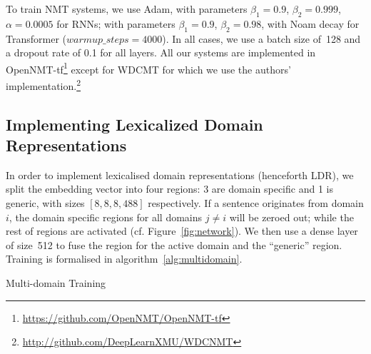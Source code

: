 \documentclass[11pt,a4paper]{article}
\newcommand{\fyDone}[1]{\done[FY]\Todo[FY:]{\textcolor{orange}{#1}}}
\begin{document}
To train NMT systems, we use Adam, with parameters $\beta_1=0.9$, $\beta_2 = 0.999$, $\alpha=0.0005$ for RNNs; with parameters $\beta_1=0.9$, $\beta_2= 0.98$, with Noam decay \cite{Vaswani17attention} for Transformer ($warmup\_steps=4000$). In all cases, we use a batch size of~128 and a dropout rate of 0.1 for all layers. 
All our systems are implemented in OpenNMT-tf\footnote{\url{https://github.com/OpenNMT/OpenNMT-tf}} \cite{Klein17opennmt} except for WDCMT for which we use the authors' implementation.\footnote{\noindent\url{http://github.com/DeepLearnXMU/WDCNMT}}\fyDone{batch size}

\subsection{Implementing Lexicalized Domain Representations}\fyDone{Check acronym.}

\fyDone{Motivate the split - discuss experimentally embedding size}
In order to implement lexicalised domain representations (henceforth LDR), we split the embedding vector into four regions: 3 are domain specific and 1 is generic, with sizes $[8,8,8,488]$ respectively. %
If a sentence originates from domain $i$, the domain specific regions for all domains $j \neq i$ will be zeroed out; while the rest of regions are activated (cf. Figure~\ref{fig:network}). We then use a dense layer of size~512 to fuse the region for the active domain and the ``generic'' region. Training is formalised in algorithm~\ref{alg:multidomain}.

\begin{algorithm}[h]
\caption{Multi-domain Training}
\label{alg:multidomain}
\begin{algorithmic}[1]
\REPEAT 
{}
\end{algorithmic}
\end{algorithm}
\end{document}
